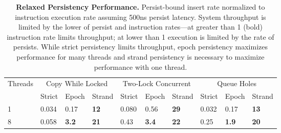 \begin{table*}
  \centering
  \begin{tabular}{ l l l l l l l l l l }
    \hline
    Threads & \multicolumn{3}{c}{Copy While Locked} & \multicolumn{3}{c}{Two-Lock Concurrent} & \multicolumn{3}{c}{Queue Holes} \\
    & Strict & Epoch & Strand & Strict & Epoch & Strand & Strict & Epoch & Strand \\
    \hline \hline
    1 & 0.034 & 0.17 & \textbf{12} & 0.080 & 0.56 & \textbf{29} & 0.032 & 0.17 & \textbf{13} \\
    8 & 0.058 & \textbf{3.2} & \textbf{21} & 0.43 & \textbf{3.4} & \textbf{22} & 0.25 & \textbf{1.9} & \textbf{20} \\
    \hline
  \end{tabular}
  \caption{
    \textbf{Relaxed Persistency Performance.}
    Persist-bound insert rate normalized to instruction execution rate assuming 500ns persist latency.
    System throughput is limited by the lower of persist and instruction rates---at greater than 1 (bold) instruction rate limits throughput; at lower than 1 execution is limited by the rate of persists.
    While strict persistency limits throughput, epoch persistency maximizes performance for many threads and strand persistency is necessary to maximize performance with one thread.
  }
  \label{table::RelaxedPerformance}
\end{table*}
